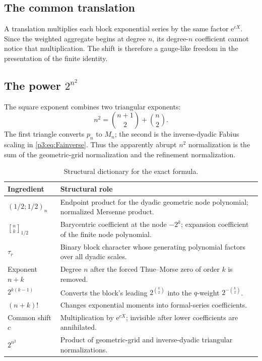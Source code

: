 \documentclass[11pt,oneside]{article}
\theoremstyle{definition}
\theoremstyle{remark}
\newcommand{\qpoch}[3]{\left(#1;#2\right)_{#3}}
\newcommand{\halfqbinom}[2]{{\genfrac{[}{]}{0pt}{}{#1}{#2}}_{1/2}}
\newcommand{\e}{\mathrm e}
\newcommand{\tm}{\tau}
\begin{document}
\subsection{The common translation}

A translation multiplies each block exponential series by the same factor
$\e^{cX}$.  Since the weighted aggregate begins at degree $n$, its degree-$n$
coefficient cannot notice that multiplication.  The shift is therefore a
gauge-like freedom in the presentation of the finite identity.

\subsection{The power \texorpdfstring{$2^{n^2}$}{2 to the n-squared}}

The square exponent combines two triangular exponents:
\begin{equation}\label{p3:eq:squaresplit}
 n^2=\binom{n+1}{2}+\binom n2.
\end{equation}
The first triangle converts $p_n$ to $M_n$; the second is the inverse-dyadic
Fabius scaling in \eqref{p3:eq:Fainverse}.  Thus the apparently abrupt $n^2$
normalization is the sum of the geometric-grid normalization and the
refinement normalization.

\begin{table}[H]
\centering
\caption{Structural dictionary for the exact formula.}
\label{p3:tab:roles}
\begin{tabularx}{\textwidth}{@{}>{\raggedright\arraybackslash}p{}X@{}}
\toprule
Ingredient & Structural role\\
\midrule
$\qpoch{1/2}{1/2}{n}$ & Endpoint product for the dyadic geometric node polynomial; normalized Mersenne product.\\
$\halfqbinom{n}{k}$ & Barycentric coefficient at the node $-2^k$; expansion coefficient of the finite node polynomial.\\
$\tm_r$ & Binary block character whose generating polynomial factors over all dyadic scales.\\
Exponent $n+k$ & Degree $n$ after the forced Thue--Morse zero of order $k$ is removed.\\
$2^{k(k-1)}$ & Converts the block's leading $2^{\binom{k}{2}}$ into the $q$-weight $2^{-\binom{k}{2}}$.\\
$(n+k)!$ & Changes exponential moments into formal-series coefficients.\\
Common shift $c$ & Multiplication by $\e^{cX}$; invisible after lower coefficients are annihilated.\\
$2^{n^2}$ & Product of geometric-grid and inverse-dyadic triangular normalizations.\\
\bottomrule
\end{tabularx}
\end{table}
\end{document}

